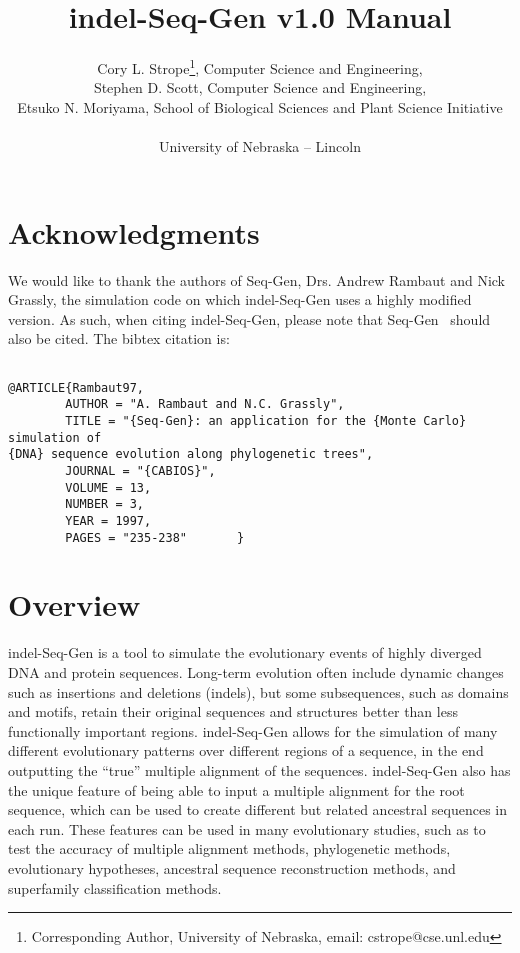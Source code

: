 \documentclass[10pt]{article}
\begin{document}
\title{indel-Seq-Gen v1.0 Manual}
\author{Cory L. Strope\thanks{Corresponding Author, University of Nebraska, email: 
cstrope@cse.unl.edu}, Computer Science and Engineering,\\
        Stephen D. Scott, Computer Science and Engineering,\\
        Etsuko N. Moriyama, School of Biological Sciences and Plant Science Initiative\\~\\
	University of Nebraska -- Lincoln
}

\maketitle

\tableofcontents
\newpage
\listoftables
\listoffigures
\newpage
\section{Acknowledgments}

We would like to thank the authors of Seq-Gen, Drs. Andrew Rambaut and Nick Grassly, the simulation
code on which indel-Seq-Gen uses a highly modified version. As such, when citing indel-Seq-Gen, please note that 
Seq-Gen~\cite{Rambaut97} should also be cited.  The bibtex citation is:

\begin{verbatim}

@ARTICLE{Rambaut97,
        AUTHOR = "A. Rambaut and N.C. Grassly",
        TITLE = "{Seq-Gen}: an application for the {Monte Carlo} simulation of 
{DNA} sequence evolution along phylogenetic trees",
        JOURNAL = "{CABIOS}",
        VOLUME = 13,
        NUMBER = 3,
        YEAR = 1997,
        PAGES = "235-238"       }

\end{verbatim}

\newpage

\section{Overview}

indel-Seq-Gen is a tool to simulate the evolutionary events of highly diverged DNA and protein 
sequences.  Long-term evolution often include dynamic changes such as
insertions and deletions (indels), but some subsequences, such as domains and
motifs, retain their original sequences and structures better than less functionally important
regions.  indel-Seq-Gen allows for the simulation of many different evolutionary patterns over
different regions of a sequence, in the end outputting the ``true'' multiple alignment
of the sequences.  indel-Seq-Gen also has the unique feature of being able to input a multiple
alignment for the root sequence, which can be used to create different but related ancestral
sequences in each run.  These features can be used in many evolutionary studies, such as to
test the accuracy of multiple alignment methods, phylogenetic methods, evolutionary
hypotheses, ancestral sequence reconstruction methods, and superfamily classification methods.
\end{document}
